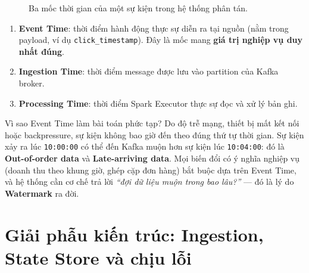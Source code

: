 \documentclass[12pt]{article}
\begin{document}
\begin{figure}[H]
\centering
{}
\caption{Ba mốc thời gian của một sự kiện trong hệ thống phân tán.}
\label{fig:three-times}
\end{figure}

\begin{enumerate}
    \item \textbf{Event Time}: thời điểm hành động thực sự diễn ra tại nguồn (nằm trong payload, ví dụ \texttt{click\_timestamp}). Đây là mốc mang \textbf{giá trị nghiệp vụ duy nhất đúng}.
    \item \textbf{Ingestion Time}: thời điểm message được lưu vào partition của Kafka broker.
    \item \textbf{Processing Time}: thời điểm Spark Executor thực sự đọc và xử lý bản ghi.
\end{enumerate}

\begin{infobox}{Vì sao Event Time làm bài toán phức tạp?}
Do độ trễ mạng, thiết bị mất kết nối hoặc backpressure, sự kiện không bao giờ đến theo đúng thứ tự thời gian. Sự kiện xảy ra lúc \texttt{10:00:00} có thể đến Kafka muộn hơn sự kiện lúc \texttt{10:04:00}: đó là \textbf{Out-of-order data} và \textbf{Late-arriving data}. Mọi biến đổi có ý nghĩa nghiệp vụ (doanh thu theo khung giờ, ghép cặp đơn hàng) bắt buộc dựa trên Event Time, và hệ thống cần cơ chế trả lời \textit{``đợi dữ liệu muộn trong bao lâu?''} --- đó là lý do \textbf{Watermark} ra đời.
\end{infobox}

\section{Giải phẫu kiến trúc: Ingestion, State Store và chịu lỗi}
\end{document}

